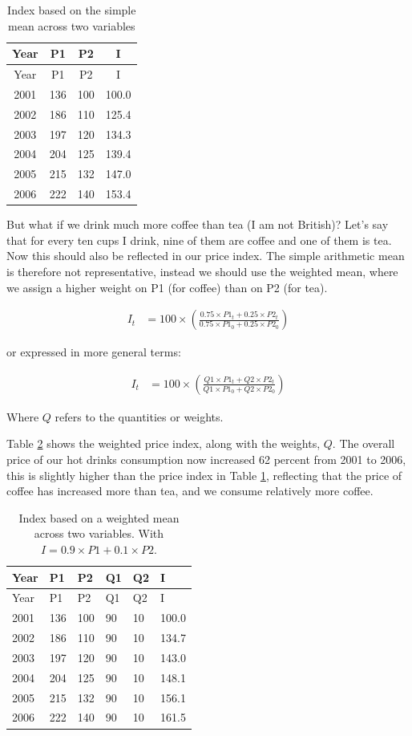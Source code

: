 \documentclass[
]{book}
\begin{document}
\begin{longtable}[]{@{}cccc@{}}
\caption{\label{tab:price2} Index based on the simple mean across two variables}\tabularnewline
\toprule
Year & P1 & P2 & I \\
\midrule
\endfirsthead
\toprule
Year & P1 & P2 & I \\
\midrule
\endhead
2001 & 136 & 100 & 100.0 \\
2002 & 186 & 110 & 125.4 \\
2003 & 197 & 120 & 134.3 \\
2004 & 204 & 125 & 139.4 \\
2005 & 215 & 132 & 147.0 \\
2006 & 222 & 140 & 153.4 \\
\bottomrule
\end{longtable}

But what if we drink much more coffee than tea (I am not British)? Let's say that for every ten cups I drink, nine of them are coffee and one of them is tea. Now this should also be reflected in our price index. The simple arithmetic mean is therefore not representative, instead we should use the weighted mean, where we assign a higher weight on P1 (for coffee) than on P2 (for tea).

\begin{align}
   I_t&=100\times \left(\frac{0.75\times P1_t+0.25\times P2_t}{0.75\times P1_0+0.25\times P2_0}\right)
    \label{eq6}
\end{align}

or expressed in more general terms:

\begin{align}
   I_t&=100\times \left(\frac{Q1 \times P1_t+Q2 \times P2_t}{Q1 \times P1_0+Q2 \times P2_0}\right)
    \label{eq7}
\end{align}

Where \(Q\) refers to the quantities or weights.

Table \ref{tab:price3} shows the weighted price index, along with the weights, \(Q\). The overall price of our hot drinks consumption now increased 62 percent from 2001 to 2006, this is slightly higher than the price index in Table \ref{tab:price2}, reflecting that the price of coffee has increased more than tea, and we consume relatively more coffee.

\begin{longtable}[]{@{}llllll@{}}
\caption{\label{tab:price3} Index based on a weighted mean across two variables. With \(I=0.9\times P1+0.1\times P2\).}\tabularnewline
\toprule
Year & P1 & P2 & Q1 & Q2 & I \\
\midrule
\endfirsthead
\toprule
Year & P1 & P2 & Q1 & Q2 & I \\
\midrule
\endhead
2001 & 136 & 100 & 90 & 10 & 100.0 \\
2002 & 186 & 110 & 90 & 10 & 134.7 \\
2003 & 197 & 120 & 90 & 10 & 143.0 \\
2004 & 204 & 125 & 90 & 10 & 148.1 \\
2005 & 215 & 132 & 90 & 10 & 156.1 \\
2006 & 222 & 140 & 90 & 10 & 161.5 \\
\bottomrule
\end{longtable}
\end{document}
